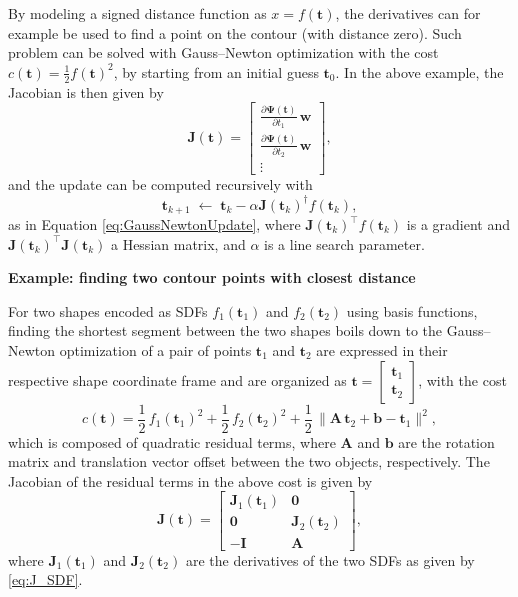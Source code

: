 \documentclass[10pt,a4paper]{article} %
\newcommand{\trsp}{{\scriptscriptstyle\top}}
\newcommand{\psin}{{\dagger}}
\begin{document}
By modeling a signed distance function as $x = f(\bm{t})$, the derivatives can for example be used to find a point on the contour (with distance zero). Such problem can be solved with Gauss--Newton optimization with the cost $c(\bm{t})= \frac{1}{2} f(\bm{t})^2$, by starting from an initial guess $\bm{t}_0$. In the above example, the Jacobian is then given by
\begin{equation}
	\bm{J}(\bm{t}) = \begin{bmatrix} \frac{\partial\bm{\Psi}(\bm{t})}{\partial t_1} \,\bm{w} 
	\\[2mm] \frac{\partial\bm{\Psi}(\bm{t})}{\partial t_2} \,\bm{w} \\ \vdots \end{bmatrix},
	\label{eq:J_SDF}
\end{equation}
and the update can be computed recursively with
\begin{equation}
	\bm{t}_{k+1} \;\leftarrow\; \bm{t}_k - \alpha \bm{J}(\bm{t}_k)^\psin f(\bm{t}_k),
	\label{eq:update_SDF}
\end{equation}
as in Equation \eqref{eq:GaussNewtonUpdate}, where $\bm{J}(\bm{t}_k)^\trsp f(\bm{t}_k)$ is a gradient and $\bm{J}(\bm{t}_k)^\trsp \bm{J}(\bm{t}_k)$ a Hessian matrix, and $\alpha$ is a line search parameter.\newline


\noindent\textbf{Example: finding two contour points with closest distance}\newline

For two shapes encoded as SDFs $f_1(\bm{t}_1)$ and $f_2(\bm{t}_2)$ using basis functions, finding the shortest segment between the two shapes boils down to the Gauss--Newton optimization of a pair of points $\bm{t}_1$ and $\bm{t}_2$ are expressed in their respective shape coordinate frame and are organized as $\bm{t} = \begin{bmatrix} \bm{t}_1 \\ \bm{t}_2 \end{bmatrix}$, with the cost
\begin{equation}
	c(\bm{t}) = \frac{1}{2} \, f_1(\bm{t}_1)^2 + \frac{1}{2} \, f_2(\bm{t}_2)^2 + \frac{1}{2} \, \|\bm{A} \, \bm{t}_2 + \bm{b} - \bm{t}_1\|^2,
\end{equation}
which is composed of quadratic residual terms, where $\bm{A}$ and $\bm{b}$ are the rotation matrix and translation vector offset between the two objects, respectively. The Jacobian of the residual terms in the above cost is given by
\begin{equation}
	\bm{J}(\bm{t}) = \begin{bmatrix} \bm{J}_1(\bm{t}_1) & \bm{0} \\ \bm{0} & \bm{J}_2(\bm{t}_2) \\ -\bm{I} & \bm{A} \end{bmatrix},
\end{equation}
where $\bm{J}_1(\bm{t}_1)$ and $\bm{J}_2(\bm{t}_2)$ are the derivatives of the two SDFs as given by \eqref{eq:J_SDF}.
\end{document}
